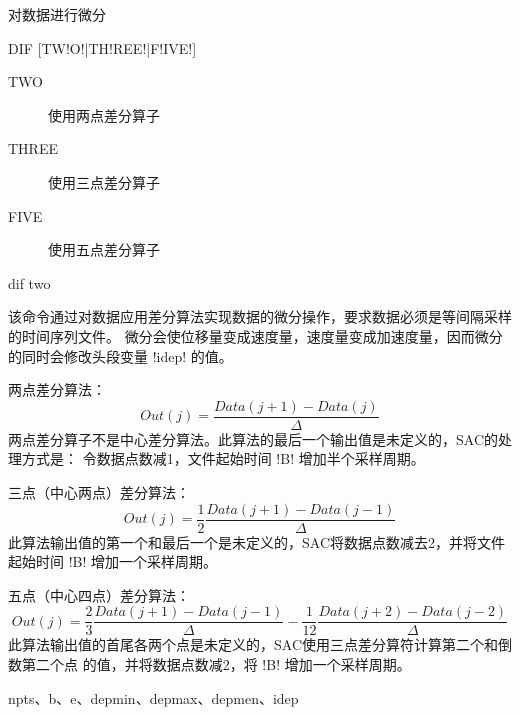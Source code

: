 \label{cmd:dif}

对数据进行微分

\begin{SACSTX}
DIF [TW!O!|TH!REE!|F!IVE!]
\end{SACSTX}

\begin{description}
\item [TWO]   使用两点差分算子
\item [THREE] 使用三点差分算子
\item [FIVE]  使用五点差分算子
\end{description}

\begin{SACDFT}
dif two
\end{SACDFT}

该命令通过对数据应用差分算法实现数据的微分操作，要求数据必须是等间隔采样的时间序列文件。
微分会使位移量变成速度量，速度量变成加速度量，因而微分的同时会修改头段变量 
!idep! 的值。

两点差分算法：
\[ Out(j) =\frac{Data(j+1) - Data(j)}{\Delta} \]
两点差分算子不是中心差分算法。此算法的最后一个输出值是未定义的，SAC的处理方式是：
令数据点数减1，文件起始时间 !B! 增加半个采样周期。

三点（中心两点）差分算法：
\[ Out(j) = \frac{1}{2} \frac{Data(j+1) - Data(j-1)}{\Delta} \]
此算法输出值的第一个和最后一个是未定义的，SAC将数据点数减去2，并将文件起始时间 !B!
增加一个采样周期。

五点（中心四点）差分算法：
\[ Out(j) = \frac{2}{3} \frac{Data(j+1) - Data(j-1)}{\Delta} - \frac{1}{12} \frac{Data(j+2) - Data(j-2)}{\Delta} \]
此算法输出值的首尾各两个点是未定义的，SAC使用三点差分算符计算第二个和倒数第二个点
的值，并将数据点数减2，将 !B! 增加一个采样周期。



npts、b、e、depmin、depmax、depmen、idep
